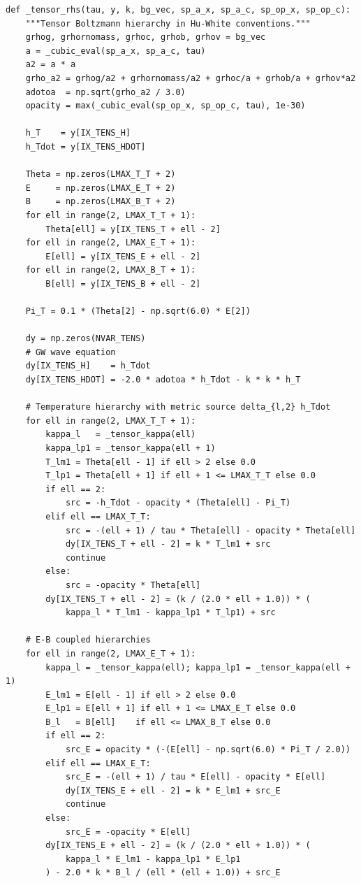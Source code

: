 \begin{codebox}
\begin{lstlisting}[style=python]
def _tensor_rhs(tau, y, k, bg_vec, sp_a_x, sp_a_c, sp_op_x, sp_op_c):
    """Tensor Boltzmann hierarchy in Hu-White conventions."""
    grhog, grhornomass, grhoc, grhob, grhov = bg_vec
    a = _cubic_eval(sp_a_x, sp_a_c, tau)
    a2 = a * a
    grho_a2 = grhog/a2 + grhornomass/a2 + grhoc/a + grhob/a + grhov*a2
    adotoa  = np.sqrt(grho_a2 / 3.0)
    opacity = max(_cubic_eval(sp_op_x, sp_op_c, tau), 1e-30)

    h_T    = y[IX_TENS_H]
    h_Tdot = y[IX_TENS_HDOT]

    Theta = np.zeros(LMAX_T_T + 2)
    E     = np.zeros(LMAX_E_T + 2)
    B     = np.zeros(LMAX_B_T + 2)
    for ell in range(2, LMAX_T_T + 1):
        Theta[ell] = y[IX_TENS_T + ell - 2]
    for ell in range(2, LMAX_E_T + 1):
        E[ell] = y[IX_TENS_E + ell - 2]
    for ell in range(2, LMAX_B_T + 1):
        B[ell] = y[IX_TENS_B + ell - 2]

    Pi_T = 0.1 * (Theta[2] - np.sqrt(6.0) * E[2])

    dy = np.zeros(NVAR_TENS)
    # GW wave equation
    dy[IX_TENS_H]    = h_Tdot
    dy[IX_TENS_HDOT] = -2.0 * adotoa * h_Tdot - k * k * h_T

    # Temperature hierarchy with metric source delta_{l,2} h_Tdot
    for ell in range(2, LMAX_T_T + 1):
        kappa_l   = _tensor_kappa(ell)
        kappa_lp1 = _tensor_kappa(ell + 1)
        T_lm1 = Theta[ell - 1] if ell > 2 else 0.0
        T_lp1 = Theta[ell + 1] if ell + 1 <= LMAX_T_T else 0.0
        if ell == 2:
            src = -h_Tdot - opacity * (Theta[ell] - Pi_T)
        elif ell == LMAX_T_T:
            src = -(ell + 1) / tau * Theta[ell] - opacity * Theta[ell]
            dy[IX_TENS_T + ell - 2] = k * T_lm1 + src
            continue
        else:
            src = -opacity * Theta[ell]
        dy[IX_TENS_T + ell - 2] = (k / (2.0 * ell + 1.0)) * (
            kappa_l * T_lm1 - kappa_lp1 * T_lp1) + src

    # E-B coupled hierarchies
    for ell in range(2, LMAX_E_T + 1):
        kappa_l = _tensor_kappa(ell); kappa_lp1 = _tensor_kappa(ell + 1)
        E_lm1 = E[ell - 1] if ell > 2 else 0.0
        E_lp1 = E[ell + 1] if ell + 1 <= LMAX_E_T else 0.0
        B_l   = B[ell]    if ell <= LMAX_B_T else 0.0
        if ell == 2:
            src_E = opacity * (-(E[ell] - np.sqrt(6.0) * Pi_T / 2.0))
        elif ell == LMAX_E_T:
            src_E = -(ell + 1) / tau * E[ell] - opacity * E[ell]
            dy[IX_TENS_E + ell - 2] = k * E_lm1 + src_E
            continue
        else:
            src_E = -opacity * E[ell]
        dy[IX_TENS_E + ell - 2] = (k / (2.0 * ell + 1.0)) * (
            kappa_l * E_lm1 - kappa_lp1 * E_lp1
        ) - 2.0 * k * B_l / (ell * (ell + 1.0)) + src_E


\end{lstlisting}
\end{codebox}
